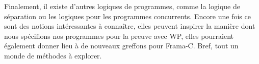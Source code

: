 \documentclass[12pt,francais,]{scrbook}
\begin{document}
Finalement, il existe d'autres logiques de programmes, comme la logique
de séparation ou les logiques pour les programmes concurrents. Encore
une fois ce sont des notions intéressantes à connaître, elles peuvent
inspirer la manière dont nous spécifions nos programmes pour la preuve
avec WP, elles pourraient également donner lieu à de nouveaux greffons
pour Frama-C. Bref, tout un monde de méthodes à explorer.
\end{document}

